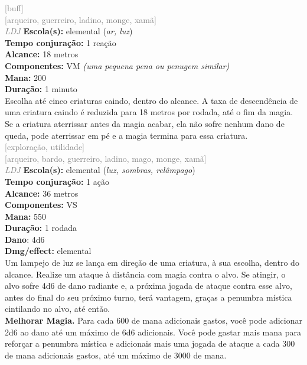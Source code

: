 \documentclass{RPG_Adventure}[2021/10/20]
\begin{document}
{\scriptsize \textcolor{gray}{[buff]\\}}
{\scriptsize \textcolor{gray}{[arqueiro, guerreiro, ladino, monge, xamã]\\}}
{\tiny \textcolor{gray}{\textit{LDJ}}}\jump{}
{\small \t \textbf{Escola(s):} elemental (\textit{ar, luz})\\\t \textbf{Tempo conjuração:} 1 reação\\\t \textbf{Alcance:} 18 metros\\\t \textbf{Componentes:} VM \textit{(uma pequena pena ou penugem similar)}\\\t \textbf{Mana:} 200\\\t \textbf{Duração:} 1 minuto\\}
{\normalsize Escolha até cinco criaturas caindo, dentro do alcance. A taxa de descendência de uma criatura caindo é reduzida para 18 metros por rodada, até o fim da magia. Se a criatura aterrissar antes da magia acabar, ela não sofre nenhum dano de queda, pode aterrissar em pé e a magia termina para essa criatura.\\}
{\scriptsize \textcolor{gray}{[exploração, utilidade]\\}}
{\scriptsize \textcolor{gray}{[arqueiro, bardo, guerreiro, ladino, mago, monge, xamã]\\}}
{\tiny \textcolor{gray}{\textit{LDJ}}}\jump{}
{\small \t \textbf{Escola(s):} elemental (\textit{luz, sombras, relâmpago})\\\t \textbf{Tempo conjuração:} 1 ação\\\t \textbf{Alcance:} 36 metros\\\t \textbf{Componentes:} VS\\\t \textbf{Mana:} 550\\\t \textbf{Duração:} 1 rodada\\\t \textbf{Dano}: 4d6\\\t \textbf{Dmg/effect:} elemental\\}
{\normalsize Um lampejo de luz se lança em direção de uma criatura, à sua escolha, dentro do alcance. Realize um ataque à distância com magia contra o alvo. Se atingir, o alvo sofre 4d6 de dano radiante e, a próxima jogada de ataque contra esse alvo, antes do final do seu próximo turno, terá vantagem, graças a penumbra mística cintilando no alvo, até então.\\\t \textbf{Melhorar Magia.} Para cada 600 de mana adicionais gastos, você pode adicionar 2d6 ao dano até um máximo de 6d6 adicionais. Você pode gastar mais mana para reforçar a penumbra mística e adicionais mais uma jogada de ataque a cada 300 de mana adicionais gastos, até um máximo de 3000 de mana.\\}
\end{document}
